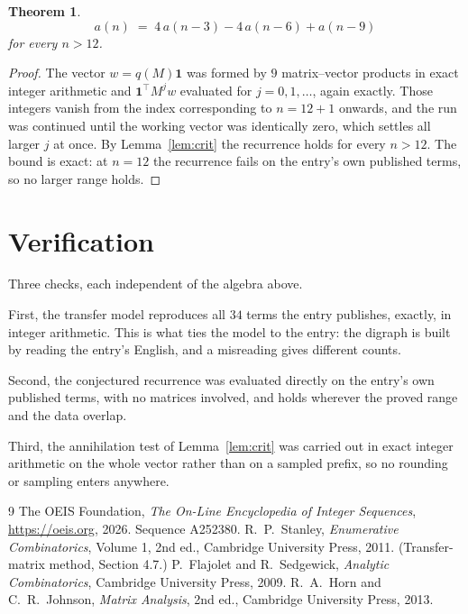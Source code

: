 \documentclass[11pt,a4paper]{article}
\theoremstyle{plain}
\newtheorem{theorem}{Theorem}
\theoremstyle{definition}
\begin{document}
\begin{theorem}
\[
a(n)\;=\;4\,a(n-3) - 4\,a(n-6) + a(n-9)
\]
for every $n>12$.
\end{theorem}

\begin{proof}
The vector $w=q(M)\mathbf{1}$ was formed by $9$ matrix--vector products in exact
integer arithmetic and $\mathbf{1}^{\!\top}M^{j}w$ evaluated for $j=0,1,\dots$, again
exactly. Those integers vanish from the index corresponding to $n=12+1$ onwards, and the
run was continued until the working vector was identically zero, which settles all larger $j$
at once. By Lemma~\ref{lem:crit} the recurrence holds for every $n>12$. The bound is exact: at $n=12$ the recurrence fails on the entry's own published terms, so no larger range holds.
\end{proof}

\section{Verification}

Three checks, each independent of the algebra above.

First, the transfer model reproduces all $34$ terms the entry publishes, exactly, in
integer arithmetic. This is what ties the model to the entry: the digraph is built by reading
the entry's English, and a misreading gives different counts.

Second, the conjectured recurrence was evaluated directly on the entry's own published terms,
with no matrices involved, and holds wherever the proved range and the data overlap.

Third, the annihilation test of Lemma~\ref{lem:crit} was carried out in exact integer
arithmetic on the whole vector rather than on a sampled prefix, so no rounding or sampling
enters anywhere.

\begin{thebibliography}{9}
 The OEIS Foundation, \emph{The On-Line Encyclopedia of Integer
Sequences}, \url{https://oeis.org}, 2026. Sequence A252380.
 R.~P.~Stanley, \emph{Enumerative Combinatorics}, Volume 1, 2nd ed.,
Cambridge University Press, 2011. (Transfer-matrix method, Section 4.7.)
 P.~Flajolet and R.~Sedgewick, \emph{Analytic Combinatorics}, Cambridge
University Press, 2009.
 R.~A.~Horn and C.~R.~Johnson, \emph{Matrix Analysis}, 2nd ed., Cambridge
University Press, 2013.
\end{thebibliography}
\end{document}
